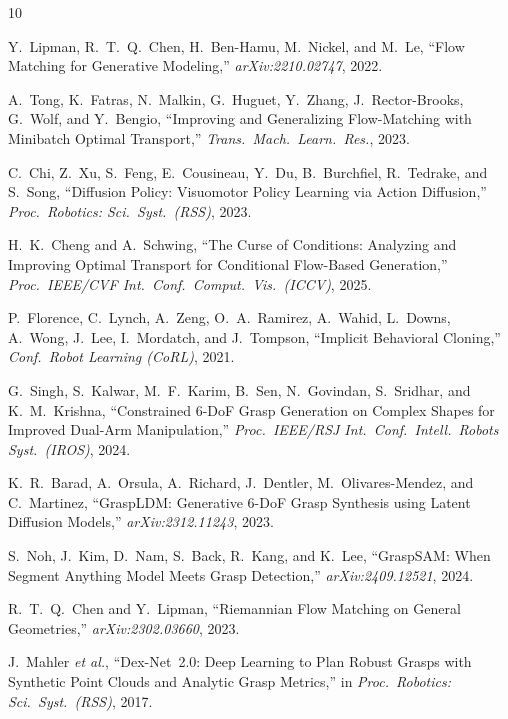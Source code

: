 \documentclass[journal]{IEEEtran}
\begin{document}
\begin{thebibliography}{10}

Y.~Lipman, R.~T.~Q.~Chen, H.~Ben-Hamu, M.~Nickel, and M.~Le,
``Flow Matching for Generative Modeling,''
\emph{arXiv:2210.02747}, 2022.

A.~Tong, K.~Fatras, N.~Malkin, G.~Huguet, Y.~Zhang,
J.~Rector-Brooks, G.~Wolf, and Y.~Bengio,
``Improving and Generalizing Flow-Matching with Minibatch Optimal
  Transport,''
\emph{Trans.\ Mach.\ Learn.\ Res.}, 2023.

C.~Chi, Z.~Xu, S.~Feng, E.~Cousineau, Y.~Du, B.~Burchfiel,
R.~Tedrake, and S.~Song,
``Diffusion Policy: Visuomotor Policy Learning via Action Diffusion,''
\emph{Proc.\ Robotics: Sci.\ Syst.\ (RSS)}, 2023.

H.~K.~Cheng and A.~Schwing,
``The Curse of Conditions: Analyzing and Improving Optimal Transport for
  Conditional Flow-Based Generation,''
\emph{Proc.\ IEEE/CVF Int.\ Conf.\ Comput.\ Vis.\ (ICCV)}, 2025.

P.~Florence, C.~Lynch, A.~Zeng, O.~A.~Ramirez, A.~Wahid, L.~Downs,
A.~Wong, J.~Lee, I.~Mordatch, and J.~Tompson,
``Implicit Behavioral Cloning,''
\emph{Conf.\ Robot Learning (CoRL)}, 2021.

G.~Singh, S.~Kalwar, M.~F.~Karim, B.~Sen, N.~Govindan, S.~Sridhar, and
K.~M.~Krishna,
``Constrained 6-DoF Grasp Generation on Complex Shapes for Improved
  Dual-Arm Manipulation,''
\emph{Proc.\ IEEE/RSJ Int.\ Conf.\ Intell.\ Robots Syst.\ (IROS)}, 2024.

K.~R.~Barad, A.~Orsula, A.~Richard, J.~Dentler,
M.~Olivares-Mendez, and C.~Martinez,
``GraspLDM: Generative 6-DoF Grasp Synthesis using Latent Diffusion
  Models,''
\emph{arXiv:2312.11243}, 2023.

S.~Noh, J.~Kim, D.~Nam, S.~Back, R.~Kang, and K.~Lee,
``GraspSAM: When Segment Anything Model Meets Grasp Detection,''
\emph{arXiv:2409.12521}, 2024.

R.~T.~Q.~Chen and Y.~Lipman,
``Riemannian Flow Matching on General Geometries,''
\emph{arXiv:2302.03660}, 2023.

J.~Mahler \emph{et al.},
``Dex-Net~2.0: Deep Learning to Plan Robust Grasps with Synthetic Point
  Clouds and Analytic Grasp Metrics,''
in \emph{Proc.\ Robotics: Sci.\ Syst.\ (RSS)}, 2017.


\end{thebibliography}
\end{document}
